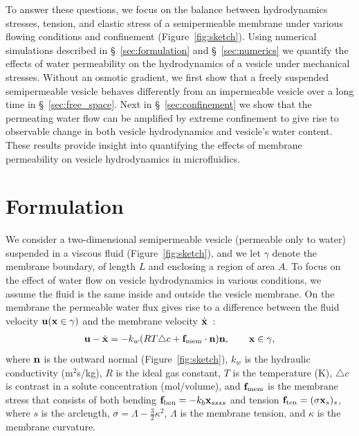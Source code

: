 \documentclass[prb,preprint,showpacs,preprintnumbers,amsmath,amssymb,longbibliography]{revtex4-1}
\begin{document}
To answer these
questions, we focus on the balance between hydrodynamics stresses,
tension, and elastic stress of a semipermeable membrane under various
flowing conditions and confinement (Figure~\ref{fig:sketch}).
%
Using numerical simulations described in \S~\ref{sec:formulation} and
\S~\ref{sec:numerics} we quantify the effects of water permeability on
the hydrodynamics of a vesicle under mechanical stresses.  Without an
osmotic gradient, we first show that a freely suspended semipermeable
vesicle behaves differently from an impermeable vesicle over a long time
in \S~\ref{sec:free_space}. Next in \S~\ref{sec:confinement} we show
that
the permeating water flow can be amplified by extreme confinement to give rise to observable change in both  vesicle hydrodynamics and vesicle's water content. 
These results provide insight into quantifying the effects of membrane permeability on vesicle hydrodynamics in microfluidics.
%
 

\section{Formulation\label{sec:formulation}}
We consider a two-dimensional semipermeable vesicle (permeable only to
water) suspended in a viscous fluid (Figure~\ref{fig:sketch}), and we
let $\gamma$ denote the membrane boundary, of length $L$ and enclosing a
region of area $A$.
%
%
To focus on the effect of water flow on vesicle
hydrodynamics in various conditions, we assume the fluid is the same
inside and outside the vesicle membrane. On the membrane the permeable
water flux gives rise to a difference between the fluid velocity
${\mathbf{u}}({\mathbf{x}}\in \gamma)$ and the membrane velocity
$\dot{\mathbf{x}}$~\cite{yao-mor2017}:
\begin{align}
\label{eqn:water_flux}
  \mathbf{u} - \dot{\mathbf{x}} = - k_w (R T \triangle c + \mathbf{f}_\mathrm{mem} \cdot \mathbf{n}) \mathbf{n}, \qquad
  \mathbf{x} \in \gamma,
\end{align}
where $\mathbf{n}$ is the outward normal (Figure~\ref{fig:sketch}), $k_w$ is
the hydraulic conductivity (m$^2$s/kg), $R$ is the ideal gas constant,
$T$ is the temperature (K), $\triangle c$ is contrast in a solute
concentration (mol/volume), and $\mathbf{f}_\mathrm{mem}$ is the membrane
stress that consists of both bending $ \mathbf{f}_\mathrm{ben}= -k_b
\mathbf{x}_{ssss}$ and tension $\mathbf{f}_\mathrm{ten}=(\sigma \mathbf{x}_s)_s$, where $s$
is the arclength, $\sigma = \Lambda - \frac{3}{2}\kappa^2$, $\Lambda$ is the
membrane tension, and $\kappa$ is the membrane curvature. 
\end{document}
